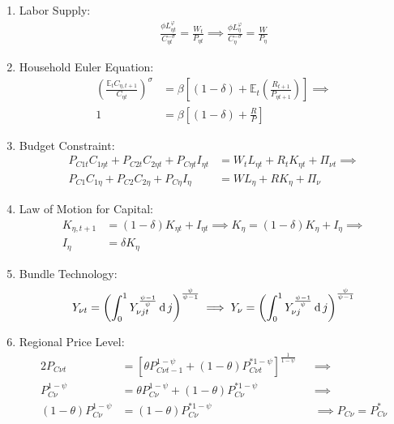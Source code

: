 \documentclass[
thesis.tex
]{subfiles}
\begin{document}
\begin{enumerate}
	\item Labor Supply:
	\begin{align}
		\frac{\phi L_{\eta t}^{\varphi}}{C_{\eta t}^{-\sigma}} = \frac{W_t}{P_{\eta t}} \implies \frac{\phi L_{\eta}^{\varphi}}{C_{\eta}^{-\sigma}} = \frac{W}{P_\eta} \label{eq:reg-ss-household-labor-supply}
	\end{align}
	
	\item Household Euler Equation: 
	\begin{align}
		\left( \frac{\mathbb{E}_t C_{\eta, t+1}}{C_{\eta t}} \right)^\sigma &= \beta \left[ (1-\delta) + \mathbb{E}_t \left(\frac{R_{t+1}}{P_{\eta t+1}}\right) \right] \implies \nonumber \\
		1 &= \beta \left[ (1-\delta) + \frac{R}{P} \right] \label{eq:reg-ss-household-euler-equation}
	\end{align}
	
	\item Budget Constraint: 
	\begin{align}
		P_{C1t} C_{1\eta t} + P_{C2t} C_{2\eta t} + P_{C\eta t} I_{\eta t} &= W_t L_{\eta t} + R_t K_{\eta t} + \Pi_{\nu t} \implies \nonumber \\
		P_{C1} C_{1\eta} + P_{C2} C_{2\eta} + P_{C\eta} I_{\eta} &= W L_{\eta} + R K_{\eta} + \Pi_{\nu} \label{eq:reg-ss-household-budget-constraint}
	\end{align}
	
	\item Law of Motion for Capital:
	\begin{align}
		K_{\eta, t+1} &= (1-\delta)K_{\eta t} + I_{\eta t} \implies K_{\eta} = (1-\delta)K_{\eta} + I_{\eta} \implies \nonumber \\
		I_{\eta} &= \delta K_{\eta} \label{eq:reg-ss-law-of-motion-for-capital}
	\end{align}
	
	\item Bundle Technology:
	\begin{align}
		Y_{\nu t} = \left( \int_{0}^{1} Y_{\nu jt}^{\frac{\psi-1}{\psi}} \dif j \right)^{\frac{\psi}{\psi-1}} \implies %
		Y_{\nu} = \left( \int_{0}^{1} Y_{\nu j}^{\frac{\psi-1}{\psi}} \dif j \right)^{\frac{\psi}{\psi-1}} \label{eq:reg-ss-final-goods-firm-bundle-rule}
	\end{align}
	
	\item Regional Price Level:
	\begin{alignat}{2}
		\label{eq:reg-ss-general-price-level}
		P_{C\nu t} &= \left[ \theta P_{C\nu t-1}^{1-\psi} + (1-\theta) P_{C\nu t}^{\ast 1-\psi} \right]^\frac{1}{1-\psi} &&\implies \nonumber \\
		P_{C\nu}^{1-\psi} &= \theta P_{C\nu}^{1-\psi} + (1-\theta) P_{C\nu}^{\ast 1-\psi} &&\implies \nonumber \\ 
		(1-\theta) P_{C\nu}^{1-\psi} &= (1-\theta) P_{C\nu}^{\ast 1-\psi} &&\implies P_{C\nu} = P_{C\nu}^\ast
	\end{alignat}
	

\end{enumerate}
\end{document}
